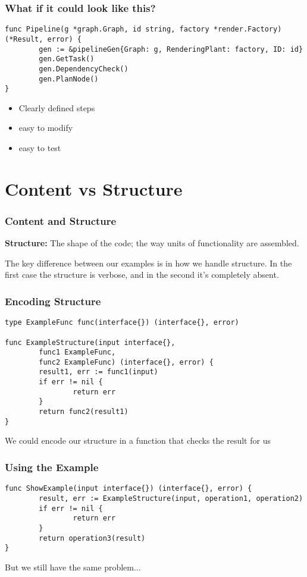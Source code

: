 \documentclass{beamer}
\begin{document}
\begin{frame}[fragile]
  \frametitle{What if it could look like this?}
\begin{lstlisting}
func Pipeline(g *graph.Graph, id string, factory *render.Factory) (*Result, error) {
        gen := &pipelineGen{Graph: g, RenderingPlant: factory, ID: id}
        gen.GetTask()
        gen.DependencyCheck()
        gen.PlanNode()
}
\end{lstlisting}

  \begin{itemize}
  \item Clearly defined steps
  \item easy to modify
  \item easy to test
  \end{itemize}
\end{frame}

\section{Content vs Structure}

\begin{frame}
  \frametitle{Content and Structure}
  {\bf Structure:} The shape of the code; the way units of functionality are assembled.

  \vfill

  The key difference between our examples is in how we handle
  structure.  In the first case the structure is verbose, and in the
  second it's completely absent.

  \vfill
\end{frame}

\begin{frame}[fragile]
  \frametitle{Encoding Structure}
\begin{lstlisting}
type ExampleFunc func(interface{}) (interface{}, error)

func ExampleStructure(input interface{},
        func1 ExampleFunc,
        func2 ExampleFunc) (interface{}, error) {
        result1, err := func1(input)
        if err != nil {
                return err
        }
        return func2(result1)
}
\end{lstlisting}
  \vfill
  We could encode our structure in a function that checks the result for us
\end{frame}

\begin{frame}[fragile]
  \frametitle{Using the Example}
\begin{lstlisting}
func ShowExample(input interface{}) (interface{}, error) {
        result, err := ExampleStructure(input, operation1, operation2)
        if err != nil {
                return err
        }
        return operation3(result)
}
\end{lstlisting}
  \vfill
  But we still have the same problem...
\end{frame}
\end{document}
